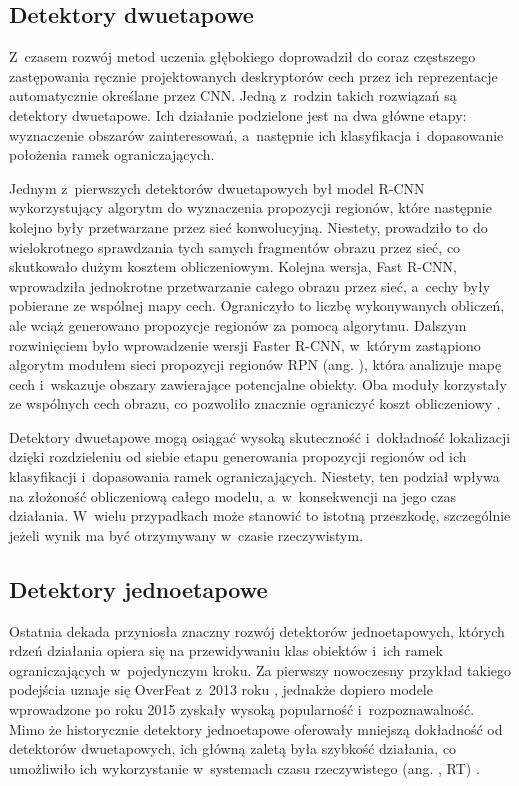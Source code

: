 \subsection{Detektory dwuetapowe}

Z~czasem rozwój metod uczenia głębokiego doprowadził do coraz częstszego zastępowania ręcznie projektowanych deskryptorów cech przez ich reprezentacje automatycznie określane przez CNN. Jedną z~rodzin takich rozwiązań są detektory dwuetapowe. Ich działanie podzielone jest na dwa główne etapy: wyznaczenie obszarów zainteresowań, a~następnie ich klasyfikacja i~dopasowanie położenia ramek ograniczających.

Jednym z~pierwszych detektorów dwuetapowych był model R-CNN wykorzystujący algorytm do wyznaczenia propozycji regionów, które następnie kolejno były przetwarzane przez sieć konwolucyjną. Niestety, prowadziło to do wielokrotnego sprawdzania tych samych fragmentów obrazu przez sieć, co skutkowało dużym kosztem obliczeniowym. Kolejna wersja, Fast R-CNN, wprowadziła jednokrotne przetwarzanie całego obrazu przez sieć, a~cechy były pobierane ze wspólnej mapy cech. Ograniczyło to liczbę wykonywanych obliczeń, ale wciąż generowano propozycje regionów za pomocą algorytmu. Dalszym rozwinięciem było wprowadzenie wersji Faster R-CNN, w~którym zastąpiono algorytm modułem sieci propozycji regionów RPN (ang. ), która analizuje mapę cech i~wskazuje obszary zawierające potencjalne obiekty. Oba moduły korzystały ze wspólnych cech obrazu, co pozwoliło znacznie ograniczyć koszt obliczeniowy \cite{bib:ren2016fasterrcnnrealtimeobject}.

Detektory dwuetapowe mogą osiągać wysoką skuteczność i~dokładność lokalizacji dzięki rozdzieleniu od siebie etapu generowania propozycji regionów od ich klasyfikacji i~dopasowania ramek ograniczających. Niestety, ten podział wpływa na złożoność obliczeniową całego modelu, a~w~konsekwencji na jego czas działania. W~wielu przypadkach może stanowić to istotną przeszkodę, szczególnie jeżeli wynik ma być otrzymywany w~czasie rzeczywistym.

\subsection{Detektory jednoetapowe}

Ostatnia dekada przyniosła znaczny rozwój detektorów jednoetapowych, których rdzeń działania opiera się na przewidywaniu klas obiektów i~ich ramek ograniczających w~pojedynczym kroku. Za pierwszy nowoczesny przykład takiego podejścia uznaje się OverFeat z~2013 roku \cite{bib:sermanet2014overfeatintegratedrecognitionlocalization}, jednakże dopiero modele wprowadzone po roku 2015 zyskały wysoką popularność i~rozpoznawalność. Mimo że historycznie detektory jednoetapowe oferowały mniejszą dokładność od detektorów dwuetapowych, ich główną zaletą była szybkość działania, co umożliwiło ich wykorzystanie w~systemach czasu rzeczywistego (ang. , RT) \cite{bib:zou2023objectdetection,bib:lin2018focallossdenseobject}.

